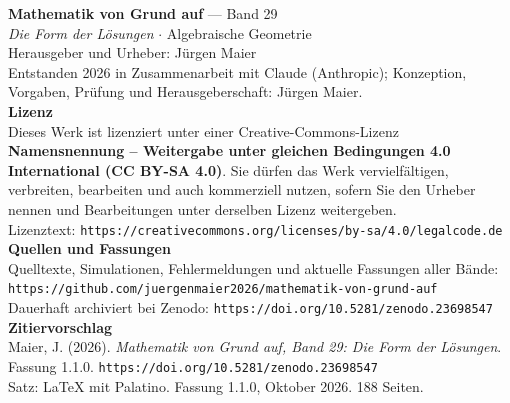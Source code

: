\thispagestyle{empty}
\vspace*{\fill}
\begin{flushleft}
{\small\color{grau}
\textbf{\color{tief}Mathematik von Grund auf} --- Band 29\\[2pt]
\textit{Die Form der Lösungen} $\cdot$ Algebraische Geometrie\\[14pt]

Herausgeber und Urheber: Jürgen Maier\\[2pt]
Entstanden 2026 in Zusammenarbeit mit Claude (Anthropic); Konzeption, Vorgaben, Prüfung und Herausgeberschaft: Jürgen Maier.\\[14pt]

\textbf{Lizenz}\\[2pt]
Dieses Werk ist lizenziert unter einer Creative-Commons-Lizenz \textbf{Namensnennung -- Weitergabe unter gleichen Bedingungen 4.0 International (CC BY-SA 4.0)}. Sie dürfen das Werk vervielfältigen, verbreiten, bearbeiten und auch kommerziell nutzen, sofern Sie den Urheber nennen und Bearbeitungen unter derselben Lizenz weitergeben.\\[2pt]
Lizenztext: \texttt{https://creativecommons.org/licenses/by-sa/4.0/legalcode.de}\\[14pt]

\textbf{Quellen und Fassungen}\\[2pt]
Quelltexte, Simulationen, Fehlermeldungen und aktuelle Fassungen aller Bände:\\
\texttt{https://github.com/juergenmaier2026/mathematik-von-grund-auf}\\[2pt]
Dauerhaft archiviert bei Zenodo: \texttt{https://doi.org/10.5281/zenodo.23698547}\\[14pt]

\textbf{Zitiervorschlag}\\[2pt]
Maier, J. (2026). \textit{Mathematik von Grund auf, Band 29: Die Form der Lösungen}. Fassung 1.1.0. \texttt{https://doi.org/10.5281/zenodo.23698547}\\[14pt]

Satz: \LaTeX{} mit Palatino. Fassung 1.1.0, Oktober 2026. 188 Seiten.
}
\end{flushleft}
\vspace*{1.5cm}
